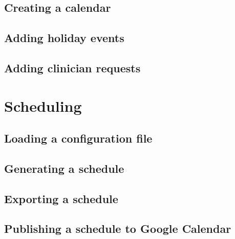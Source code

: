 \documentclass[letterpaper,10pt,english]{sphinxmanual}
\begin{document}
\subsection{Creating a calendar}
\label{\detokenize{index:creating-a-calendar}}

\subsection{Adding holiday events}
\label{\detokenize{index:adding-holiday-events}}

\subsection{Adding clinician requests}
\label{\detokenize{index:adding-clinician-requests}}

\section{Scheduling}
\label{\detokenize{index:scheduling}}

\subsection{Loading a configuration file}
\label{\detokenize{index:id1}}

\subsection{Generating a schedule}
\label{\detokenize{index:generating-a-schedule}}

\subsection{Exporting a schedule}
\label{\detokenize{index:exporting-a-schedule}}

\subsection{Publishing a schedule to Google Calendar}
\label{\detokenize{index:publishing-a-schedule-to-google-calendar}}


\renewcommand{\indexname}{Index}
\printindex
\end{document}
